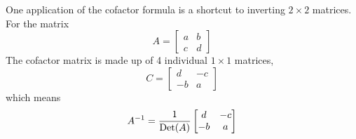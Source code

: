One application of the cofactor formula is a shortcut to inverting $2 \times 2$ matrices. 
For the matrix 
$$A = \begin{bmatrix}
a & b \\
c & d
\end{bmatrix}$$
The cofactor matrix is made up of 4 individual $1 \times 1$ matrices,
$$C = \begin{bmatrix}
d & -c \\
-b & a
\end{bmatrix}$$
which means 
$$A^{-1} = \frac{1}{\operatorname{Det}(A)} \begin{bmatrix}
d & -c \\
-b & a
\end{bmatrix}$$






